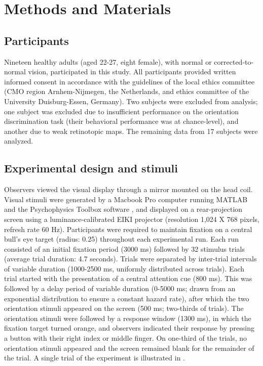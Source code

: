 \documentclass[9pt,lineno]{aperture}
\begin{document}
\section{Methods and Materials}
\label{sec:methods}
\subsection{Participants}
Nineteen healthy adults (aged 22-27, eight female), with normal or corrected-to-normal vision, participated in this study. All participants provided written informed consent in accordance with the guidelines of the local ethics committee (CMO region Arnhem-Nijmegen, the Netherlands, and ethics committee of the University Duisburg-Essen, Germany). Two subjects were excluded from analysis; one subject was excluded due to insufficient performance on the orientation discrimination task (their behavioral performance was at chance-level), and another due to weak retinotopic maps. The remaining data from 17 subjects were analyzed.

\subsection{Experimental design and stimuli}
\label{sec:examples}

Observers viewed the visual display through a mirror mounted on the head coil. Visual stimuli were generated by a Macbook Pro computer running MATLAB and the Psychophysics Toolbox software \citep{Brainard1997,Pelli1997}, and displayed on a rear-projection screen using a luminance-calibrated EIKI projector (resolution 1,024 X 768 pixels, refresh rate 60 Hz).
Participants were required to maintain fixation on a central bull's eye target (radius: 0.25\textdegree) throughout each experimental run. Each run consisted of an initial fixation period (3000 ms) followed by 32 stimulus trials (average trial duration: 4.7 seconds). Trials were separated by inter-trial intervals of variable duration (1000-2500 ms, uniformly distributed across trials). Each trial started with the presentation of a central attention cue (800 ms). This was followed by a delay period of variable duration (0-5000 ms; drawn from an exponential distribution to ensure a constant hazard rate), after which the two orientation stimuli appeared on the screen (500 ms; two-thirds of trials). The orientation stimuli were followed by a response window (1300 ms), in which the fixation target turned orange, and observers indicated their response by pressing a button with their right index or middle finger. On one-third of the trials, no orientation stimuli appeared and the screen remained blank for the remainder of the trial. A single trial of the experiment is illustrated in .
\end{document}
